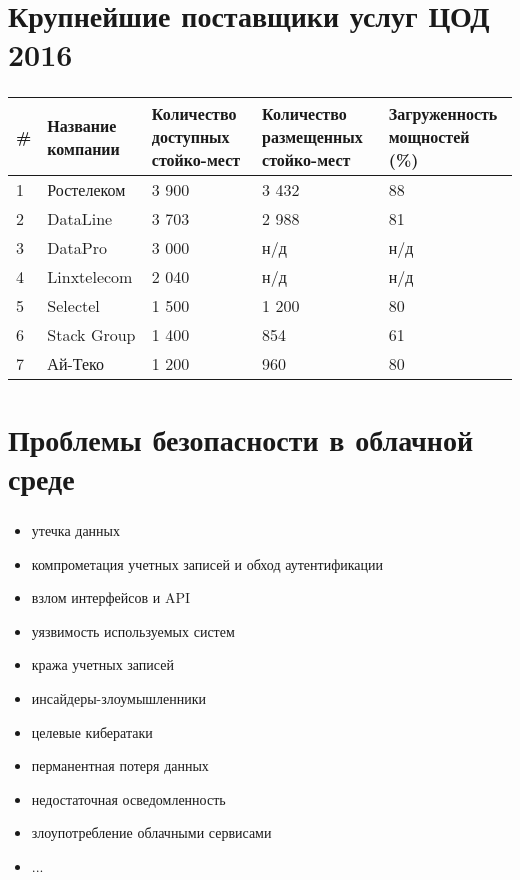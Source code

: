 
\section{Крупнейшие поставщики услуг ЦОД 2016}

\begin{frame}
\frametitle{\insertsection}
\begin{table}[H]
  \begin{tabular}{|p{0.3cm}|p{2cm}|p{2cm}|p{2.3cm}|p{2.6cm}|}
  \hline \# & Название компании & Количество доступных стойко-мест & Количество размещенных стойко-мест & Загруженность мощностей (\%) \\
  \hline 1 & Ростелеком & 3 900 & 3 432 & 88 \\
  \hline 2 & DataLine & 3 703 & 2 988 & 81 \\
  \hline 3 & DataPro & 3 000 & н/д & н/д \\
  \hline 4 & Linxtelecom & 2 040 & н/д & н/д \\
  \hline 5 & Selectel & 1 500 & 1 200 & 80 \\
  \hline 6 & Stack Group & 1 400 & 854 & 61 \\
  \hline 7 & Ай-Теко & 1 200 & 960 & 80 \\
  \hline
  \end{tabular}
\end{table}
\end{frame}


\section{Проблемы безопасности в облачной среде}

\begin{frame}
\frametitle{\insertsection}

\begin{itemize}
    \item утечка данных
    \item компрометация учетных записей и обход аутентификации
    \item взлом интерфейсов и API
    \item уязвимость используемых систем
    \item кража учетных записей
    \item инсайдеры-злоумышленники
    \item целевые кибератаки
    \item перманентная потеря данных
    \item недостаточная осведомленность
    \item злоупотребление облачными сервисами
    \item ...
\end{itemize}
\end{frame}

